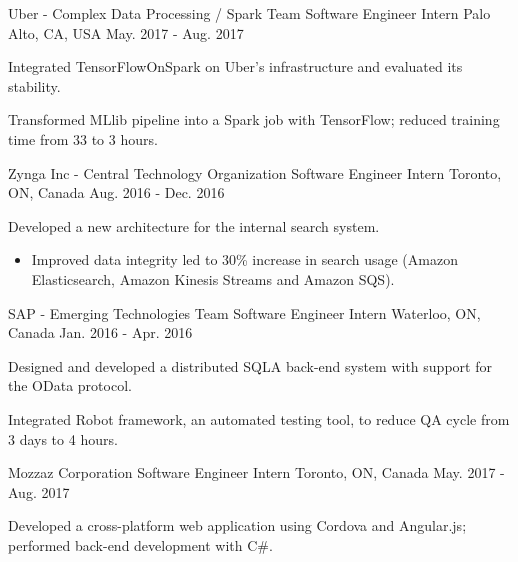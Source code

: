\begin{cventries}
{}
\cventry
{Uber - Complex Data Processing / Spark Team} %
{Software Engineer Intern} %
{Palo Alto, CA, USA} %
{May. 2017 - Aug. 2017} %
{ %
\begin{cvitems}
\item {Integrated TensorFlowOnSpark on Uber's infrastructure and evaluated its stability.}
\item {Transformed MLlib pipeline into a Spark job with TensorFlow; reduced training time from 33 to 3 hours.}
\end{cvitems}
}
\cventry
{Zynga Inc - Central Technology Organization} %
{Software Engineer Intern} %
{Toronto, ON, Canada} %
{Aug. 2016 - Dec. 2016} %
{ %
\begin{cvitems}
\item {Developed a new architecture for the internal search system.}
\begin{itemize}[label=$\cdot$,leftmargin=0.7em]
\item {Improved data integrity led to 30\% increase in search usage (Amazon Elasticsearch, Amazon Kinesis Streams and Amazon SQS).}
\end{itemize}
\end{cvitems}
}
\cventry
{SAP - Emerging Technologies Team} %
{Software Engineer Intern} %
{Waterloo, ON, Canada} %
{Jan. 2016 - Apr. 2016} %
{ %
\begin{cvitems}
\item {Designed and developed a distributed SQLA back-end system with support for the OData protocol.}
\item {Integrated Robot framework, an automated testing tool, to reduce QA cycle from 3 days to 4 hours.}
\end{cvitems}
}
\cventry
{Mozzaz Corporation} %
{Software Engineer Intern} %
{Toronto, ON, Canada} %
{May. 2017 - Aug. 2017} %
{ %
\begin{cvitems}
\item {Developed a cross-platform web application using Cordova and Angular.js; performed back-end development with C\#.}
\end{cvitems}
}

\end{cventries}
